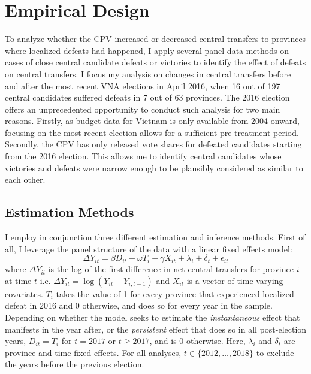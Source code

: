 \documentclass[12pt]{article}
\newcommand\fnote[1]{\footnote{\baselineskip=2\normalbaselineskip#1}}
\newcommand{\1}{\mathbbm{1}}
\let\footnote=\endnote
\begin{document}
\section*{Empirical Design}
\label{sec:methods}

To analyze whether the CPV increased or decreased central transfers to provinces where localized defeats had happened, I apply several panel data methods on cases of close central candidate defeats or victories to identify the effect of defeats on central transfers. I focus my analysis on changes in central transfers before and after the most recent VNA elections in April 2016, when 16 out of 197 central candidates suffered defeats in 7 out of 63 provinces. The 2016 election offers an unprecedented opportunity to conduct such analysis for two main reasons. Firstly, as budget data for Vietnam is only available from 2004 onward, focusing on the most recent election allows for a sufficient pre-treatment period. Secondly, the CPV has only released vote shares for defeated candidates starting from the 2016 election. This allows me to identify central candidates whose victories and defeats were narrow enough to be plausibly considered as similar to each other.

\subsection*{Estimation Methods}
\label{sec:methods_estimation}
I employ in conjunction three different estimation and inference methods. First of all, I leverage the panel structure of the data with a linear fixed effects model:
\begin{equation}
\Delta Y_{it} = \beta D_{it} + \omega T_{i} + \gamma X_{it} + \lambda_i + \delta_t + \epsilon_{it} \label{eq:FE}
\end{equation}
where $\Delta Y_{it}$ is the log of the first difference in net central transfers for province $i$ at time $t$ i.e. $\Delta Y_{it} = \log(Y_{it} - Y_{i, t-1})$ and $X_{it}$ is a vector of time-varying covariates. $T_{i}$ takes the value of 1 for every province that experienced localized defeat in 2016 and 0 otherwise, and does so for every year in the sample. Depending on whether the model seeks to estimate the \textit{instantaneous} effect that manifests in the year after, or the \textit{persistent} effect that does so in all post-election years, $D_{it} = T_{i}$ for $t=2017$ or $t\geq2017$, and is  $0$ otherwise. %
Here, $\lambda_i$ and $\delta_t$ are province and time fixed effects. For all analyses, $t \in \{2012, \ldots, 2018\}$ to exclude the years before the previous election.
\end{document}
